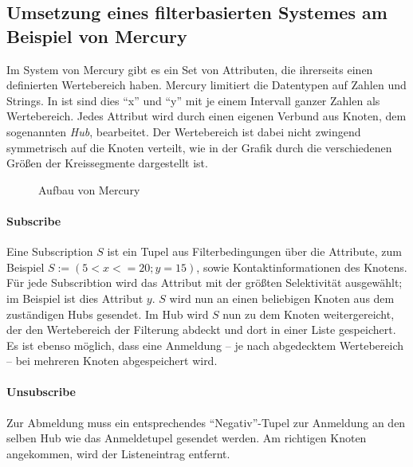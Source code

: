 \subsection[Umsetzung eines filterbasierten Systemes]{Umsetzung eines filterbasierten Systemes am Beispiel von Mercury}
\label{chap:related:mercury}
Im System von Mercury \cite{Bharambe2004Mercury} gibt es ein Set von Attributen, die ihrerseits einen definierten Wertebereich haben. Mercury limitiert die Datentypen auf Zahlen und Strings. In  ist sind dies \enquote{x'' und ``y} mit je einem Intervall ganzer Zahlen als Wertebereich. Jedes Attribut wird durch einen eigenen Verbund aus Knoten, dem sogenannten \emph{Hub}, bearbeitet. Der Wertebereich ist dabei nicht zwingend symmetrisch auf die Knoten verteilt, wie in der Grafik durch die verschiedenen Größen der Kreissegmente dargestellt ist. 

\begin{figure}[htbp]
\centering
{}
\caption{Aufbau von Mercury}
\label{fig:mercury}
\end{figure}

\paragraph{Subscribe}
Eine Subscription $S$ ist ein Tupel aus Filterbedingungen über die Attribute, zum Beispiel $S := (5 < x <= 20; y = 15)$, sowie Kontaktinformationen des Knotens. Für jede Subscribtion wird das Attribut mit der größten Selektivität ausgewählt; im Beispiel ist dies Attribut $y$. $S$ wird nun an einen beliebigen Knoten aus dem zuständigen Hubs gesendet. Im Hub wird $S$ nun zu dem Knoten weitergereicht, der den Wertebereich der Filterung abdeckt und dort in einer Liste gespeichert. Es ist ebenso möglich, dass eine Anmeldung -- je nach abgedecktem Wertebereich -- bei mehreren Knoten abgespeichert wird.

\paragraph{Unsubscribe}
Zur Abmeldung muss ein entsprechendes \enquote{Negativ}-Tupel zur Anmeldung an den selben Hub wie das Anmeldetupel gesendet werden. Am richtigen Knoten angekommen, wird der Listeneintrag entfernt.


